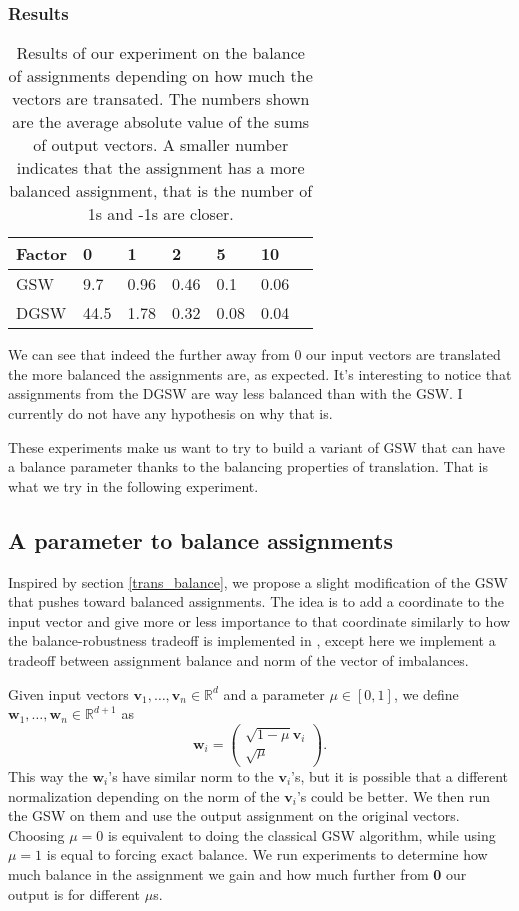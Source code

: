 \documentclass[12pt]{article}
\begin{document}
\subsubsection{Results}
\begin{center}
\begin{table}[h]
\begin{tabular}{l|llllll}
 Factor & 0 & 1  & 2 & 5 & 10  \\
\hline
GSW  & 9.7 & 0.96 & 0.46 & 0.1 & 0.06 \\
DGSW & 44.5 & 1.78 & 0.32 & 0.08 & 0.04
\end{tabular}
\caption{Results of our experiment on the balance of assignments depending on how much the vectors are transated. The numbers shown are the average absolute value of the sums of output vectors. A smaller number indicates that the assignment has a more balanced assignment, that is the number of 1s and -1s are closer.}\label{balance_when_translated}\end{table}\end{center}
We can see that indeed the further away from 0 our input vectors are translated the more balanced the assignments are, as expected. It's interesting to notice that assignments from the DGSW are way less balanced than with the GSW. I currently do not have any hypothesis on why that is.

These experiments make us want to try to build a variant of GSW that can have a balance parameter thanks to the balancing properties of translation. That is what we try in the following experiment.

\subsection{A parameter to balance assignments}\label{balance_parameter}
Inspired by section \ref{trans_balance}, we propose a slight modification of the GSW that pushes toward balanced assignments. The idea is to add a coordinate to the input vector and give more or less importance to that coordinate similarly to how the balance-robustness tradeoff is implemented in \cite{harshaw2019balancing}, except here we implement a tradeoff between assignment balance and norm of the vector of imbalances.

Given input vectors $\textbf{v}_1,\dots,\textbf{v}_n\in\mathbb{R}^d$ and a parameter $\mu\in[0,1]$, we define $\textbf{w}_1,\dots,\textbf{w}_n\in\mathbb{R}^{d+1}$ as $$\textbf{w}_i=\begin{pmatrix}\sqrt{1-\mu}\textbf{v}_i \\ \sqrt{\mu}\end{pmatrix}.$$ This way the $\textbf{w}_i$'s have similar norm to the $\textbf{v}_i$'s, but it is possible that a different normalization depending on the norm of the $\textbf{v}_i$'s could be better. We then run the GSW on them and use the output assignment on the original vectors. Choosing $\mu=0$ is equivalent to doing the classical GSW algorithm, while using $\mu=1$ is equal to forcing exact balance. We run experiments to determine how much balance in the assignment we gain and how much further from \textbf{0} our output is for different $\mu$s.
\end{document}

